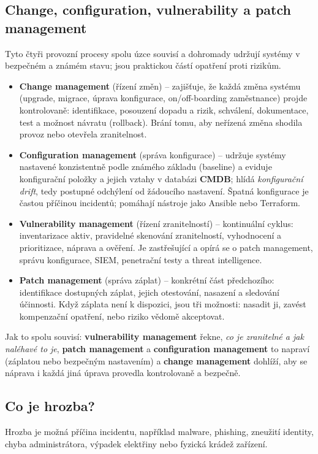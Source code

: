 \documentclass[11pt,a4paper]{article}
\begin{document}
\subsection*{Change, configuration, vulnerability a patch management}
Tyto čtyři provozní procesy spolu úzce souvisí a dohromady udržují systémy v bezpečném a známém stavu; jsou praktickou částí opatření proti rizikům.
\begin{itemize}
  \item \textbf{Change management} (řízení změn) -- zajišťuje, že každá změna systému (upgrade, migrace, úprava konfigurace, on/off-boarding zaměstnance) projde kontrolovaně: identifikace, posouzení dopadu a rizik, schválení, dokumentace, test a možnost návratu (rollback). Brání tomu, aby neřízená změna shodila provoz nebo otevřela zranitelnost.
  \item \textbf{Configuration management} (správa konfigurace) -- udržuje systémy nastavené konzistentně podle známého základu (baseline) a eviduje konfigurační položky a jejich vztahy v databázi \textbf{CMDB}; hlídá \emph{konfigurační drift}, tedy postupné odchýlení od žádoucího nastavení. Špatná konfigurace je častou příčinou incidentů; pomáhají nástroje jako Ansible nebo Terraform.
  \item \textbf{Vulnerability management} (řízení zranitelností) -- kontinuální cyklus: inventarizace aktiv, pravidelné skenování zranitelností, vyhodnocení a prioritizace, náprava a ověření. Je zastřešující a opírá se o patch management, správu konfigurace, SIEM, penetrační testy a threat intelligence.
  \item \textbf{Patch management} (správa záplat) -- konkrétní část předchozího: identifikace dostupných záplat, jejich otestování, nasazení a sledování účinnosti. Když záplata není k dispozici, jsou tři možnosti: nasadit ji, zavést kompenzační opatření, nebo riziko vědomě akceptovat.
\end{itemize}
Jak to spolu souvisí: \textbf{vulnerability management} řekne, \emph{co je zranitelné a jak naléhavé to je}, \textbf{patch management} a \textbf{configuration management} to napraví (záplatou nebo bezpečným nastavením) a \textbf{change management} dohlíží, aby se náprava i každá jiná úprava provedla kontrolovaně a bezpečně.

\subsection*{Co je hrozba?}

Hrozba je možná příčina incidentu, například malware, phishing, zneužití identity, chyba administrátora, výpadek elektřiny nebo fyzická krádež zařízení.
\end{document}
